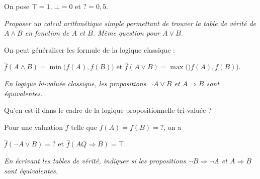 \medskip

On pose $\top =1$, $\bot =0$ et $?=0,5$.
\begin{Exercise}\it
Proposer un calcul arithmétique simple permettant de trouver la table de vérité de $A\wedge B$ en fonction de $A$ et $B$. 
Même question pour $A\vee B$.
\end{Exercise}
\begin{Answer}On peut généraliser les formule de la logique classique :

$\widehat{f}(A \wedge B)=\min \bigl(f(A), f(B)\bigr) $ et $\widehat{f}(A \vee B)=\max \bigl()f(A), f(B)\bigr) $.
\end{Answer}
\begin{Exercise}\it
En logique bi-valuée classique, les propositions $ \neg A\vee B$ et $A\Rightarrow B$ sont équivalentes. 

Qu'en est-il dans le cadre de la logique propositionnelle tri-valuée ?
\end{Exercise}
\begin{Answer}
Pour une valuation $f$ telle que $f(A) = f(B) = ?$, on a

$\widehat f(\neg A\vee B) = ?$ et  $\widehat f(AQ \Rightarrow B) = \top$.
\end{Answer}
\begin{Exercise}\it
En écrivant les tables de vérité, indiquer si les propositions $ \neg B\Rightarrow  \neg A$ et $A\Rightarrow B$ sont équivalentes.
\end{Exercise}
